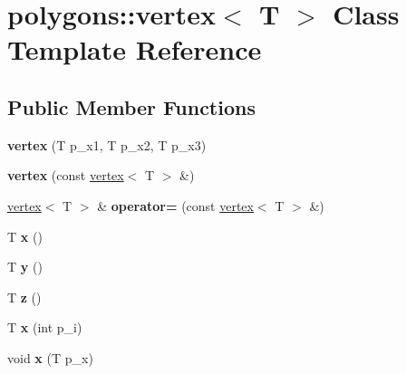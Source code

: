 \hypertarget{classpolygons_1_1vertex}{\section{polygons\-:\-:vertex$<$ T $>$ Class Template Reference}
\label{classpolygons_1_1vertex}
}
\subsection*{Public Member Functions}
\begin{DoxyCompactItemize}
\item 
\hypertarget{classpolygons_1_1vertex_a084c44b137174a94324e5cc21c132090}{{\bfseries vertex} (T p\-\_\-x1, T p\-\_\-x2, T p\-\_\-x3)}\label{classpolygons_1_1vertex_a084c44b137174a94324e5cc21c132090}

\item 
\hypertarget{classpolygons_1_1vertex_ac83cc341b484203c928f6e63831aff4f}{{\bfseries vertex} (const \hyperlink{classpolygons_1_1vertex}{vertex}$<$ T $>$ \&)}\label{classpolygons_1_1vertex_ac83cc341b484203c928f6e63831aff4f}

\item 
\hypertarget{classpolygons_1_1vertex_ac8149193ad9abf7e7848517c18e51a48}{\hyperlink{classpolygons_1_1vertex}{vertex}$<$ T $>$ \& {\bfseries operator=} (const \hyperlink{classpolygons_1_1vertex}{vertex}$<$ T $>$ \&)}\label{classpolygons_1_1vertex_ac8149193ad9abf7e7848517c18e51a48}

\item 
\hypertarget{classpolygons_1_1vertex_ace58802bc7034a44912bb5e9e2237d8f}{T {\bfseries x} ()}\label{classpolygons_1_1vertex_ace58802bc7034a44912bb5e9e2237d8f}

\item 
\hypertarget{classpolygons_1_1vertex_aef04f860e36ffa6eb0850a7300fa0595}{T {\bfseries y} ()}\label{classpolygons_1_1vertex_aef04f860e36ffa6eb0850a7300fa0595}

\item 
\hypertarget{classpolygons_1_1vertex_a9df987b209969024e8e0a06c084337a0}{T {\bfseries z} ()}\label{classpolygons_1_1vertex_a9df987b209969024e8e0a06c084337a0}

\item 
\hypertarget{classpolygons_1_1vertex_aabddd9c7117d9bf99165ddc421ee8a3e}{T {\bfseries x} (int p\-\_\-i)}\label{classpolygons_1_1vertex_aabddd9c7117d9bf99165ddc421ee8a3e}

\item 
\hypertarget{classpolygons_1_1vertex_a2fb39cd8b338d23851c04d087c151825}{void {\bfseries x} (T p\-\_\-x)}\label{classpolygons_1_1vertex_a2fb39cd8b338d23851c04d087c151825}


\end{DoxyCompactItemize}
